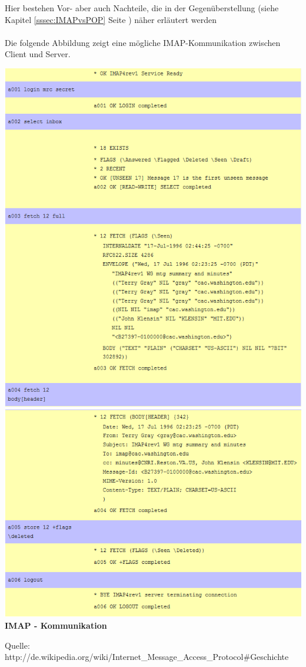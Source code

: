 \documentclass[12pt,a4paper]{report}
\begin{document}
\begin{onehalfspace}
Hier bestehen Vor- aber auch Nachteile, die in der Gegenüberstellung (siehe Kapitel \ref{sssec:IMAPvsPOP} Seite \pageref{sssec:IMAPvsPOP}) näher erläutert werden\\\\
Die folgende Abbildung zeigt eine mögliche IMAP-Kommunikation zwischen Client und Server.\\
\begin{center}
\includegraphics[scale=0.7]{../docs/lyaton/graphics/IMAP-Kommunikation_p1.png}
\includegraphics[scale=0.7]{../docs/lyaton/graphics/IMAP-Kommunikation_p2.png}\\
\textbf{IMAP - Kommunikation}\\
\begin{scriptsize}
Quelle: http://de.wikipedia.org/wiki/Internet\_Message\_Access\_Protocol\#Geschichte
\end{scriptsize}
\end{center}


\end{onehalfspace}
\end{document}
